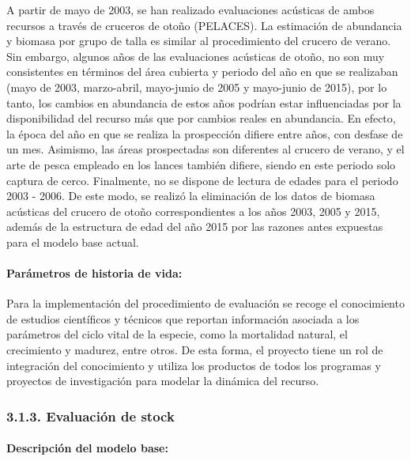 \documentclass[
  spanish,
]{article}
\begin{document}
A partir de mayo de 2003, se han realizado evaluaciones acústicas de
ambos recursos a través de cruceros de otoño (PELACES). La estimación de
abundancia y biomasa por grupo de talla es similar al procedimiento del
crucero de verano. Sin embargo, algunos años de las evaluaciones
acústicas de otoño, no son muy consistentes en términos del área
cubierta y periodo del año en que se realizaban (mayo de 2003,
marzo-abril, mayo-junio de 2005 y mayo-junio de 2015), por lo tanto, los
cambios en abundancia de estos años podrían estar influenciadas por la
disponibilidad del recurso más que por cambios reales en abundancia. En
efecto, la época del año en que se realiza la prospección difiere entre
años, con desfase de un mes. Asimismo, las áreas prospectadas son
diferentes al crucero de verano, y el arte de pesca empleado en los
lances también difiere, siendo en este periodo solo captura de cerco.
Finalmente, no se dispone de lectura de edades para el periodo 2003 -
2006. De este modo, se realizó la eliminación de los datos de biomasa
acústicas del crucero de otoño correspondientes a los años 2003, 2005 y
2015, además de la estructura de edad del año 2015 por las razones antes
expuestas para el modelo base actual.

\hypertarget{paruxe1metros-de-historia-de-vida}{%
\paragraph{Parámetros de historia de
vida:}\label{paruxe1metros-de-historia-de-vida}}

Para la implementación del procedimiento de evaluación se recoge el
conocimiento de estudios científicos y técnicos que reportan información
asociada a los parámetros del ciclo vital de la especie, como la
mortalidad natural, el crecimiento y madurez, entre otros. De esta
forma, el proyecto tiene un rol de integración del conocimiento y
utiliza los productos de todos los programas y proyectos de
investigación para modelar la dinámica del recurso.

\hypertarget{evaluaciuxf3n-de-stock-1}{%
\subsubsection{3.1.3. Evaluación de
stock}\label{evaluaciuxf3n-de-stock-1}}

\hypertarget{descripciuxf3n-del-modelo-base}{%
\paragraph{Descripción del modelo
base:}\label{descripciuxf3n-del-modelo-base}}
\end{document}
